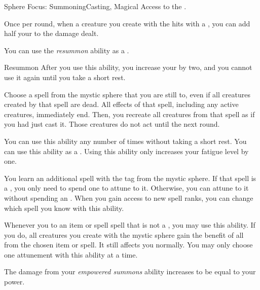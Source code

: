     \begin{feat}{Sphere Focus: Summoning}{Casting, Magical}
        \featpre Access to the  .

         Once per round, when a creature you create with the   hits with a , you can add half your  to the damage dealt.

         You can use the \textit{resummon} ability as a .
        \begin{activeability}{Resummon}
            \rankline
            After you use this ability, you increase your  by two, and you cannot use it again until you take a short rest.

            Choose a spell from the  mystic sphere that you are still  to, even if all creatures created by that spell are dead.
            All effects of that spell, including any active creatures, immediately end.
            Then, you recreate all creatures from that spell as if you had just cast it.
            Those creatures do not act until the next round.

            \rankline
             You can use this ability any number of times without taking a short rest.
             You can use this ability as a .
             Using this ability only increases your fatigue level by one.
        \end{activeability}

         You learn an additional spell with the  tag from the  mystic sphere.
        If that spell is a , you only need to spend one  to attune to it.
        Otherwise, you can attune to it without spending an .
        When you gain access to new spell ranks, you can change which spell you know with this ability.

         Whenever you  to an item or spell spell that is not a , you may use this ability.
        If you do, all creatures you create with the  mystic sphere gain the benefit of all  from the chosen item or spell.
        It still affects you normally.
        You may only choose one attunement with this ability at a time.

         The damage from your \textit{empowered summons} ability increases to be equal to your power.
    \end{feat}

